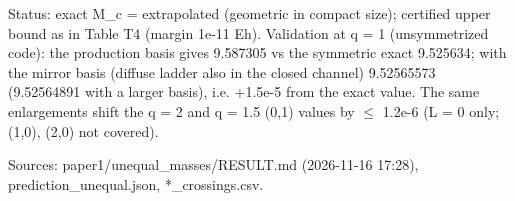 \begin{table}[t]
\par\footnotesize Status: exact M\_c = extrapolated (geometric in compact size); certified upper bound as in Table T4 (margin 1e-11 Eh). Validation at q = 1 (unsymmetrized code): the production basis gives 9.587305 vs the symmetric exact 9.525634; with the mirror basis (diffuse ladder also in the closed channel) 9.52565573 (9.52564891 with a larger basis), i.e. +1.5e-5 from the exact value. The same enlargements shift the q = 2 and q = 1.5 (0,1) values by $\le$ 1.2e-6 (L = 0 only; (1,0), (2,0) not covered).
\par\footnotesize Sources: paper1/unequal\_masses/RESULT.md (2026-11-16 17:28), prediction\_unequal.json, *\_crossings.csv.
\end{table}
